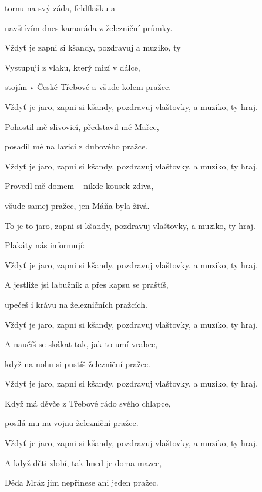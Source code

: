 

\zs
{} tornu na svý záda, feldflašku a 

navštívím dnes kamaráda z železniční průmky.

Vždyť je  zapni si kšandy,
pozdravuj  a muziko, ty 
\ks

\zs
Vystupuji z vlaku, který mizí v dálce,

stojím v České Třebové a všude kolem pražce.

Vždyť je jaro, zapni si kšandy,
pozdravuj vlaštovky, a muziko, ty hraj.
\ks

\zs
Pohostil mě slivovicí, představil mě Mařce,

posadil mě na lavici z dubového pražce.

Vždyť je jaro, zapni si kšandy,
pozdravuj vlaštovky, a muziko, ty hraj.
\ks

\zs
Provedl mě domem -- nikde kousek zdiva,

všude samej pražec, jen Máňa byla živá.

To je to jaro, zapni si kšandy,
pozdravuj vlaštovky, a muziko, ty hraj.
\ks

\zs
Plakáty nás informují: 

Vždyť je jaro, zapni si kšandy,
pozdravuj vlaštovky, a muziko, ty hraj.
\ks

\zs
A jestliže jsi labužník a přes kapsu se praštíš,

upečeš i krávu na železničních pražcích.

Vždyť je jaro, zapni si kšandy,
pozdravuj vlaštovky, a muziko, ty hraj.
\ks

\zs
A naučíš se skákat tak, jak to umí vrabec,

když na nohu si pustíš železniční pražec.

Vždyť je jaro, zapni si kšandy,
pozdravuj vlaštovky, a muziko, ty hraj.
\ks

\zs
Když má děvče z Třebové rádo svého chlapce,

posílá mu na vojnu železniční pražce.

Vždyť je jaro, zapni si kšandy,
pozdravuj vlaštovky, a muziko, ty hraj.
\ks

\zs
A když děti zlobí, tak hned je doma mazec,

Děda Mráz jim nepřinese ani jeden pražec.

